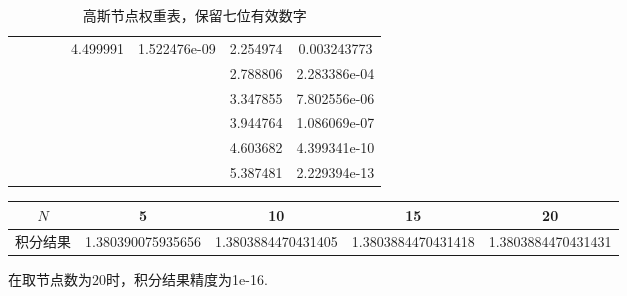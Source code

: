\documentclass[UTF8]{ctexart}
\begin{document}
\begin{table}[H]
\begin{tabular}{|c|c|c|c|c|c|c|c|}
                &             &              &             & 4.499991  & 1.522476e-09    & 2.254974  & 0.003243773 \\
                &             &              &             &              &             & 2.788806  & 2.283386e-04    \\
                &             &              &             &              &             & 3.347855  & 7.802556e-06    \\
                &             &              &             &              &             & 3.944764   & 1.086069e-07    \\
                &             &              &             &              &             & 4.603682   & 4.399341e-10    \\
                &             &              &             &              &             & 5.387481   & 2.229394e-13    \\
    \hline
    \end{tabular}
    \caption{高斯节点权重表，保留七位有效数字}
\end{table}

\begin{table}[H]
    \centering
    \begin{tabular}{|c|c|c|c|c|}
        \hline
        $N$ & 5 & 10 & 15 & 20 \\
        \hline
        积分结果 & 1.380390075935656 & 1.3803884470431405 & 1.3803884470431418 & 1.3803884470431431 \\
        \hline
    \end{tabular}
\end{table}

在取节点数为$20$时，积分结果精度为1e-16.
\end{document}
